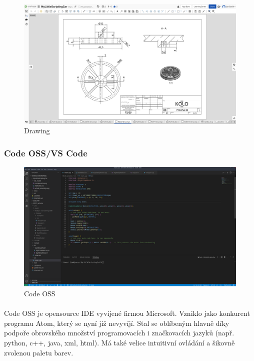 \documentclass[12pt]{article}
\begin{document}
\begin{spacing}{1.5}
	\begin{figure}[H]
		\centering
		\includegraphics[width=\linewidth]{drawing_studio}
		\caption{Drawing}
		\label{fig:drawing_studio}
	\end{figure}
	
	\subsubsection{Code OSS/VS Code}
	
	\begin{figure}[H]
		\centering
		\includegraphics[width=\linewidth]{code_oss}
		\caption{Code OSS}
		\label{fig:code_oss}
	\end{figure}
	
	\paragraph{} Code OSS je opensource IDE vyvíjené firmou Microsoft. Vzniklo jako konkurent programu Atom, který se nyní již nevyvíjí. Stal se oblíbeným hlavně díky podpoře obrovského množství programovacích i značkovacích jazyků (např. python, c++, java, xml, html). Má také velice intuitivní ovládání a šikovně zvolenou paletu barev.
	

\end{spacing}
\end{document}
